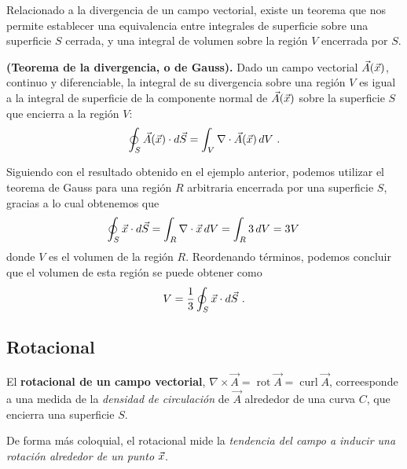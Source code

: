 
Relacionado a la divergencia de un campo vectorial, existe un teorema que nos permite establecer una equivalencia entre integrales de superficie sobre una superficie $S$ cerrada, y una integral de volumen sobre la región $V$ encerrada por $S$.

\begin{teorema}{\textbf{(Teorema de la divergencia, o de Gauss).}} 
    Dado un campo vectorial $\vec{A}(\vec{x})$, continuo y diferenciable, la integral de su divergencia sobre una región $V$ es igual a la integral de superficie de la componente normal de $\vec{A}(\vec{x})$ sobre la superficie $S$ que encierra a la región $V$:
    \begin{equation}
        \oint_S \vec{A}(\vec{x}) \cdot d\vec{S} = \int_V \nabla \cdot \vec{A}(\vec{x}) \, dV \ .
    \end{equation}
\end{teorema}

\begin{ejemplo}
    Siguiendo con el resultado obtenido en el ejemplo anterior, podemos utilizar el teorema de Gauss para una región $R$ arbitraria encerrada por una superficie $S$, gracias a lo cual obtenemos que 
    \begin{equation*}
        \oint_S \vec{x} \cdot d\vec{S} = \int_R \nabla \cdot \vec{x} \, dV = \int_R 3 \, dV = 3V \,
    \end{equation*}
    donde $V$ es el volumen de la región $R$. Reordenando términos, podemos concluir que el volumen de esta región se puede obtener como 
    \begin{equation}
        V = \frac{1}{3} \oint_S \vec{x} \cdot d\vec{S} \ .
    \end{equation}
\end{ejemplo}

\subsection{Rotacional}

\begin{defi}
    El \textbf{rotacional de un campo vectorial}, $\nabla \times \vec{A} = \operatorname{rot} \vec{A} = \operatorname{curl} \vec{A}$, correesponde a una medida de la \emph{densidad de circulación} de $\vec{A}$ alrededor de una curva $C$, que encierra una superficie $S$.

    De forma más coloquial, el rotacional mide la \emph{tendencia del campo a inducir una rotación alrededor de un punto} $\vec{x}$.
\end{defi}

